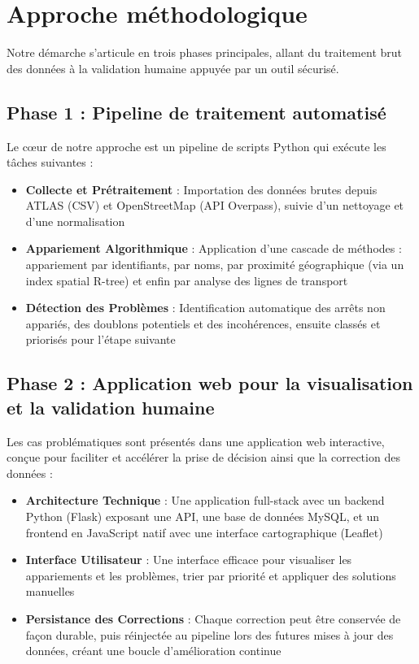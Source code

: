 \section*{Approche méthodologique}

Notre démarche s'articule en trois phases principales, allant du traitement brut des données à la validation humaine appuyée par un outil sécurisé.

\subsection*{Phase 1 : Pipeline de traitement automatisé}
Le cœur de notre approche est un pipeline de scripts Python qui exécute les tâches suivantes :
\begin{itemize}
    \item \textbf{Collecte et Prétraitement} : Importation des données brutes depuis ATLAS (CSV) et OpenStreetMap (API Overpass), suivie d'un nettoyage et d'une normalisation
    \item \textbf{Appariement Algorithmique} : Application d'une cascade de méthodes : appariement par identifiants, par noms, par proximité géographique (via un index spatial R-tree) et enfin par analyse des lignes de transport
    \item \textbf{Détection des Problèmes} : Identification automatique des arrêts non appariés, des doublons potentiels et des incohérences, ensuite classés et priorisés pour l'étape suivante
\end{itemize}

\subsection*{Phase 2 : Application web pour la visualisation et la validation humaine}
Les cas problématiques sont présentés dans une application web interactive, conçue pour faciliter et accélérer la prise de décision ainsi que la correction des données :
\begin{itemize}
    \item \textbf{Architecture Technique} : Une application full-stack avec un backend Python (Flask) exposant une API, une base de données MySQL, et un frontend en JavaScript natif avec une interface cartographique (Leaflet)
    \item \textbf{Interface Utilisateur} : Une interface efficace pour visualiser les appariements et les problèmes, trier par priorité et appliquer des solutions manuelles
    \item \textbf{Persistance des Corrections} : Chaque correction peut être conservée de façon durable, puis réinjectée au pipeline lors des futures mises à jour des données, créant une boucle d'amélioration continue
\end{itemize}

